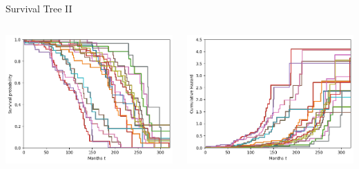 \documentclass{beamer}
\begin{document}
\begin{frame}{Survival Tree II}
    \begin{columns}
        \begin{column}{0.49 \textwidth}
            \centering
            \includegraphics[width = \textwidth]{images/st_sf.png}
        \end{column}
        \begin{column}{0.49 \textwidth}
            \centering
            \includegraphics[width = \textwidth]{images/st_chf.png}
        \end{column}
    \end{columns}
\end{frame}
\end{document}
